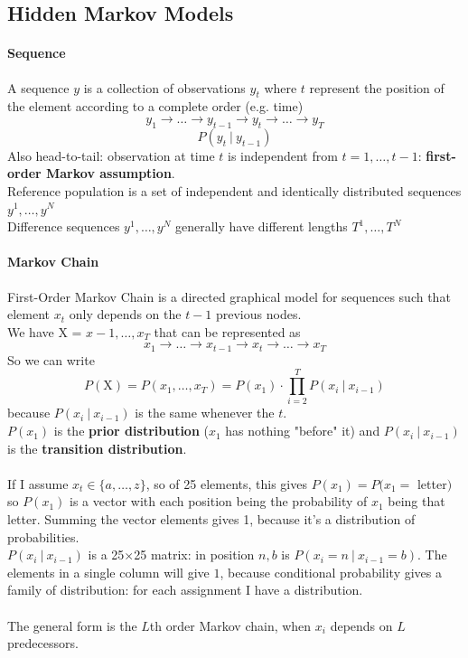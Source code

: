 \documentclass[10pt]{report}
\begin{document}
\subsection{Hidden Markov Models}
\paragraph{Sequence}A sequence $y$ is a collection of observations $y_t$ where $t$ represent the position of the element according to a complete order (e.g. time)
$$y_1\rightarrow \ldots\rightarrow y_{t-1}\rightarrow y_t\rightarrow\ldots\rightarrow y_T$$
$$P(y_t\:|\:y_{t-1})$$
Also head-to-tail: observation at time $t$ is independent from $t=1,\ldots,t-1$: \textbf{first-order Markov assumption}.\\
Reference population is a set of independent and identically distributed sequences $y^1, \ldots, y^N$\\
Difference sequences $y^1, \ldots, y^N$ generally have different lengths $T^1,\ldots,T^N$
\paragraph{Markov Chain} First-Order Markov Chain is a directed graphical model for sequences such that element $x_t$ only depends on the $t-1$ previous nodes.\\
We have X = $x-1,\ldots,x_T$ that can be represented as 
$$x_1\rightarrow \ldots\rightarrow x_{t-1}\rightarrow x_t\rightarrow\ldots\rightarrow x_T$$
So we can write $$P(\text{X}) = P(x_1,\ldots,x_T) = P(x_1)\cdot\prod_{i=2}^T P(x_i\:|\:x_{i-1})$$
because $P(x_i\:|\:x_{i-1})$ is the same whenever the $t$.\\
$P(x_1)$ is the \textbf{prior distribution} ($x_1$ has nothing "before" it) and $P(x_i\:|\:x_{i-1})$ is the \textbf{transition distribution}.\\\\
If I assume $x_t\in\{a,\ldots,z\}$, so of 25 elements, this gives $P(x_1) = P(x_1 =$ letter$)$ so $P(x_1)$ is a vector with each position being the probability of $x_1$ being that letter. Summing the vector elements gives 1, because it's a distribution of probabilities.\\
$P(x_i\:|\:x_{i-1})$ is a 25$\times$25 matrix: in position $n,b$ is $P(x_i=n\:|\:x_{i-1}=b)$. The elements in a single column will give $1$, because conditional probability gives a family of distribution: for each assignment I have a distribution.\\\\
The general form is the $L$th order Markov chain, when $x_i$ depends on $L$ predecessors.
\end{document}
